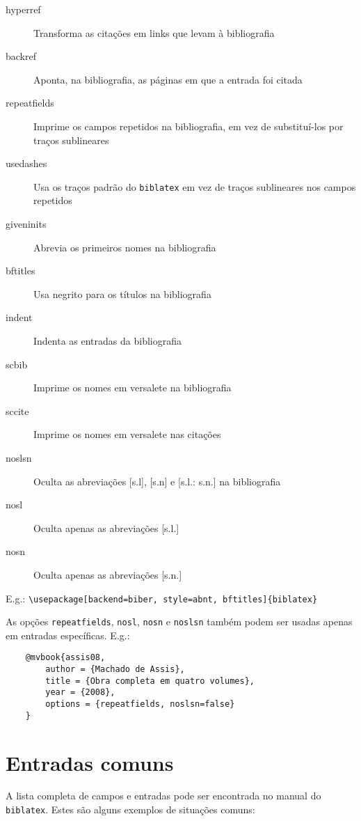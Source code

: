 \documentclass[a4paper]{article}
\begin{document}
\begin{description}
    \item [hyperref] Transforma as citações em links que levam à bibliografia
    \item [backref] Aponta, na bibliografia, as páginas em que a entrada foi citada
    \item [repeatfields] Imprime os campos repetidos na bibliografia, em vez de substituí-los por traços sublineares
    \item [usedashes] Usa os traços padrão do \texttt{biblatex} em vez de traços sublineares nos campos repetidos
    \item [giveninits] Abrevia os primeiros nomes na bibliografia
    \item [bftitles] Usa negrito para os títulos na bibliografia
    \item [indent] Indenta as entradas da bibliografia
    \item [scbib] Imprime os nomes em versalete na bibliografia
    \item [sccite] Imprime os nomes em versalete nas citações
    \item [noslsn] Oculta as abreviações [s.l], [s.n] e [s.l.: s.n.] na bibliografia
    \item [nosl] Oculta apenas as abreviações [s.l.]
    \item [nosn] Oculta apenas as abreviações [s.n.]
\end{description}

E.g.: \verb"\usepackage[backend=biber, style=abnt, bftitles]{biblatex}"

As opções \texttt{repeatfields}, \texttt{nosl}, \texttt{nosn} e \texttt{noslsn} também podem ser usadas apenas em entradas específicas. E.g.:

\begin{verbatim}
    @mvbook{assis08,
        author = {Machado de Assis},
        title = {Obra completa em quatro volumes},
        year = {2008},
        options = {repeatfields, noslsn=false}
    }
\end{verbatim}


	
\clearpage
\section{Entradas comuns}

A lista completa de campos e entradas pode ser encontrada no manual do \texttt{biblatex}. Estes são alguns exemplos de situações comuns:
\end{document}
